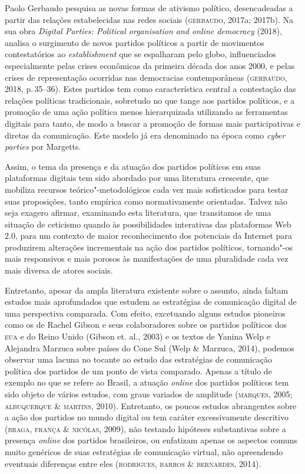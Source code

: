 Paolo Gerbaudo pesquisa as novas formas de ativismo político,
desencadeadas a partir das relações estabelecidas nas redes sociais
(\textsc{gerbaudo}, 2017a; 2017b). Na sua obra \emph{Digital Parties: Political
organisation and online democracy} (2018), analisa o surgimento de novos
partidos políticos a partir de movimentos contestatórios ao
\emph{establishment} que se espalharam pelo globo, influenciados
especialmente pelas crises econômicas da primeira década dos anos 2000,
e pelas crises de representação ocorridas nas democracias contemporâneas
(\textsc{gerbaudo}, 2018, p.\,35--36). Estes partidos tem como característica
central a contestação das relações políticas tradicionais, sobretudo no
que tange aos partidos políticos, e a promoção de uma ação política
menos hierarquizada utilizando as ferramentas digitais para tanto, de
modo a buscar a promoção de formas mais participativas e diretas da
comunicação. Este modelo já era denominado na época como \emph{cyber
parties} por Margetts.

Assim, o tema da presença e da atuação dos partidos políticos em suas
plataformas digitais tem sido abordado por uma literatura crescente, que
mobiliza recursos teórico"-metodológicos cada vez mais sofisticados para
testar suas proposições, tanto empírica como normativamente orientadas.
Talvez não seja exagero afirmar, examinando esta literatura, que
transitamos de uma situação de ceticismo quando às possibilidades
interativas das plataformas Web 2.0, para um contexto de maior
reconhecimento dos potenciais da Internet para produzirem alterações
incrementais na ação dos partidos políticos, tornando"-os mais
responsivos e mais porosos às manifestações de uma pluralidade cada vez
mais diversa de atores sociais.

Entretanto, apesar da ampla literatura existente sobre o assunto, ainda
faltam estudos mais aprofundados que estudem as estratégias de
comunicação digital de uma perspectiva comparada. Com efeito, excetuando
alguns estudos pioneiros como os de Rachel Gibson e seus colaboradores
sobre os partidos políticos dos \textsc{eua} e do Reino Unido (Gibson et. al.,
2003) e os textos de Yanina Welp e Alejandra Marzuca sobre países do
Cone Sul (Welp \& Marzuca, 2014), podemos observar uma lacuna no tocante
ao estudo das estratégias de comunicação política dos partidos de um
ponto de vista comparado. Apenas a título de exemplo no que se refere ao
Brasil, a atuação \emph{online} dos partidos políticos tem sido objeto de vários
estudos, com graus variados de amplitude (\textsc{marques}, 2005; \textsc{albuquerque} \&
\textsc{martins}, 2010). Entretanto, os poucos estudos abrangentes sobre a ação
dos partidos no mundo digital ou tem caráter excessivamente descritivo
(\textsc{braga}, \textsc{frança \& nicólas}, 2009), não testando hipóteses substantivas
sobre a presença \emph{online} dos partidos brasileiros, ou enfatizam apenas os
aspectos comuns muito genéricos de suas estratégias de comunicação
virtual, não apreendendo eventuais diferenças entre eles (\textsc{rodrigues},
\textsc{barros \& bernardes}, 2014).

